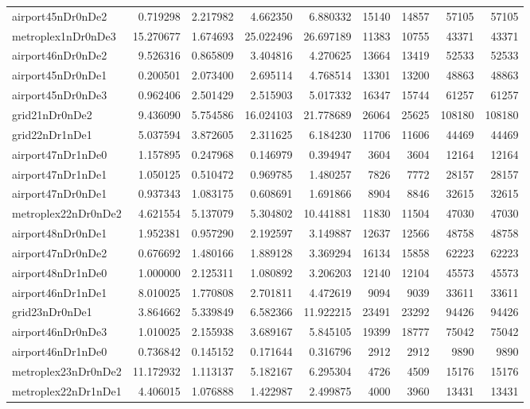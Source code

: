 \begin{longtable}{|l|r|r|r|r|r|r|r|r|}
airport45nDr0nDe2 & 0.719298 & 2.217982 & 4.662350 & 6.880332 & 15140 & 14857 & 57105 & 57105 \\
metroplex1nDr0nDe3 & 15.270677 & 1.674693 & 25.022496 & 26.697189 & 11383 & 10755 & 43371 & 43371 \\
airport46nDr0nDe2 & 9.526316 & 0.865809 & 3.404816 & 4.270625 & 13664 & 13419 & 52533 & 52533 \\
airport45nDr0nDe1 & 0.200501 & 2.073400 & 2.695114 & 4.768514 & 13301 & 13200 & 48863 & 48863 \\
airport45nDr0nDe3 & 0.962406 & 2.501429 & 2.515903 & 5.017332 & 16347 & 15744 & 61257 & 61257 \\
grid21nDr0nDe2 & 9.436090 & 5.754586 & 16.024103 & 21.778689 & 26064 & 25625 & 108180 & 108180 \\
grid22nDr1nDe1 & 5.037594 & 3.872605 & 2.311625 & 6.184230 & 11706 & 11606 & 44469 & 44469 \\
airport47nDr1nDe0 & 1.157895 & 0.247968 & 0.146979 & 0.394947 & 3604 & 3604 & 12164 & 12164 \\
airport47nDr1nDe1 & 1.050125 & 0.510472 & 0.969785 & 1.480257 & 7826 & 7772 & 28157 & 28157 \\
airport47nDr0nDe1 & 0.937343 & 1.083175 & 0.608691 & 1.691866 & 8904 & 8846 & 32615 & 32615 \\
metroplex22nDr0nDe2 & 4.621554 & 5.137079 & 5.304802 & 10.441881 & 11830 & 11504 & 47030 & 47030 \\
airport48nDr0nDe1 & 1.952381 & 0.957290 & 2.192597 & 3.149887 & 12637 & 12566 & 48758 & 48758 \\
airport47nDr0nDe2 & 0.676692 & 1.480166 & 1.889128 & 3.369294 & 16134 & 15858 & 62223 & 62223 \\
airport48nDr1nDe0 & 1.000000 & 2.125311 & 1.080892 & 3.206203 & 12140 & 12104 & 45573 & 45573 \\
airport46nDr1nDe1 & 8.010025 & 1.770808 & 2.701811 & 4.472619 & 9094 & 9039 & 33611 & 33611 \\
grid23nDr0nDe1 & 3.864662 & 5.339849 & 6.582366 & 11.922215 & 23491 & 23292 & 94426 & 94426 \\
airport46nDr0nDe3 & 1.010025 & 2.155938 & 3.689167 & 5.845105 & 19399 & 18777 & 75042 & 75042 \\
airport46nDr1nDe0 & 0.736842 & 0.145152 & 0.171644 & 0.316796 & 2912 & 2912 & 9890 & 9890 \\
metroplex23nDr0nDe2 & 11.172932 & 1.113137 & 5.182167 & 6.295304 & 4726 & 4509 & 15176 & 15176 \\
metroplex22nDr1nDe1 & 4.406015 & 1.076888 & 1.422987 & 2.499875 & 4000 & 3960 & 13431 & 13431 \\

\end{longtable}
